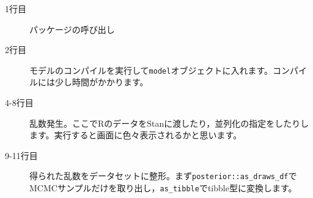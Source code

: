 \begin{description}
	\item[1行目] パッケージの呼び出し
	\item[2行目] モデルのコンパイルを実行して\texttt{model}オブジェクトに入れます。コンパイルには少し時間がかかります。
	\item[4-8行目] 乱数発生。ここでRのデータをStanに渡したり，並列化の指定をしたりします。実行すると画面に色々表示されるかと思います。
	\item[9-11行目] 得られた乱数をデータセットに整形。まず\verb|posterior::as_draws_df|でMCMCサンプルだけを取り出し，\verb|as_tibble|でtibble型に変換します。
\end{description}
